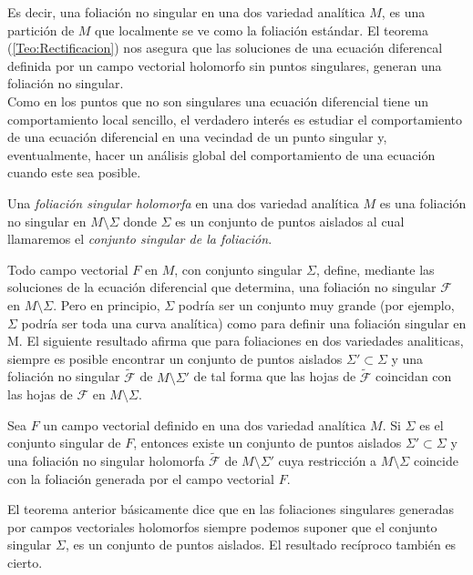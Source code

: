 Es decir, una foliación no singular en una dos variedad analítica $M$, es una partición de $M$ que localmente se ve como la foliación estándar. El teorema (\ref{Teo:Rectificacion}) nos asegura que las soluciones de una ecuación diferencal definida por un campo vectorial holomorfo sin puntos singulares, generan una foliación no singular.\\

Como en los puntos que no son singulares una ecuación diferencial tiene un comportamiento local sencillo, el verdadero interés es estudiar el comportamiento de una ecuación diferencial en una vecindad de un punto singular y, eventualmente, hacer un análisis global del comportamiento de una ecuación cuando este sea posible.

\begin{defn}
Una \emph{foliación singular holomorfa} en una dos variedad analítica $M$ es una foliación no singular en $M\setminus\Sigma$ donde $\Sigma$ es un conjunto de puntos aislados al cual llamaremos el \emph{conjunto singular de la foliación}.
\end{defn}

Todo campo vectorial $F$ en $M$, con conjunto singular $\Sigma$, define, mediante las soluciones de la ecuación diferencial que determina,  una foliación no singular $\mathcal{F}$ en $M\setminus\Sigma$. Pero en principio, $\Sigma$ podría ser un conjunto muy grande (por ejemplo, $\Sigma$ podría ser toda una curva analítica) como para definir una foliación singular en M. El siguiente resultado afirma que para foliaciones en dos variedades analiticas, siempre es posible encontrar un conjunto de puntos aislados $\Sigma'\subset\Sigma$ y una foliación no singular $\tilde{\mathcal{F}}$ de $M\setminus\Sigma'$ de tal forma que las hojas de $\tilde{\mathcal{F}}$ coincidan con las hojas de $\mathcal{F}$ en $M\setminus\Sigma$.

\begin{Teorema}
\label{Teo:ExtensionFoliaciones}
Sea $F$ un campo vectorial definido en una dos variedad analítica $M$. Si $\Sigma$ es el conjunto singular de $F$, entonces existe un conjunto de puntos aislados $\Sigma'\subset\Sigma$ y una foliación no singular holomorfa $\tilde{\mathcal{F}}$ de $M\setminus\Sigma'$ cuya restricción a $M\setminus\Sigma$ coincide con la foliación generada por el campo vectorial $F$.
\end{Teorema}

El teorema anterior básicamente dice que en las foliaciones singulares generadas por campos vectoriales holomorfos siempre podemos suponer que el conjunto singular $\Sigma$, es un conjunto de puntos aislados. El resultado recíproco también es cierto.

